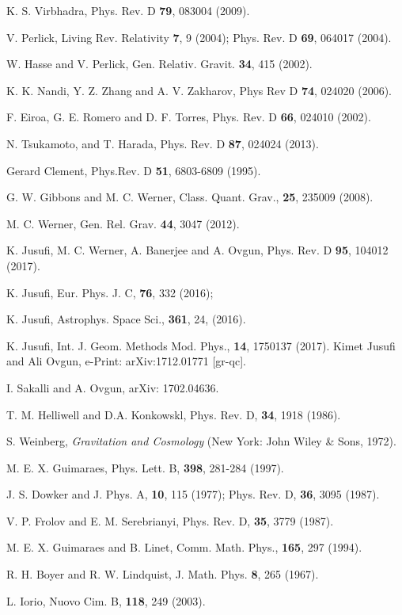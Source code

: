 \documentclass[preprint,superscriptaddress,amsfonts,amssymb,amsmath,showpacs]{revtex4}
\begin{document}
\begin{thebibliography}{99}
 K. S. Virbhadra, Phys. Rev. D \textbf{79}, 083004 (2009).

 V. Perlick, Living Rev. Relativity \textbf{7}, 9 (2004); Phys. Rev. D \textbf{69}, 064017 (2004).

 W. Hasse and V. Perlick, Gen. Relativ. Gravit. \textbf{34}, 415 (2002).

 K. K. Nandi, Y. Z. Zhang and A. V. Zakharov, Phys Rev D \textbf{74}, 024020 (2006).

 F. Eiroa, G. E. Romero and D. F. Torres, Phys. Rev. D \textbf{66}, 024010 (2002).

 N. Tsukamoto, and T. Harada, Phys. Rev. D \textbf{87}, 024024 (2013).

 Gerard Clement, Phys.Rev. D \textbf{51}, 6803-6809 (1995).


 G. W. Gibbons and M. C. Werner, Class. Quant. Grav., \textbf{25}, 235009 (2008).

  M. C. Werner, Gen. Rel. Grav. \textbf{44}, 3047 (2012).

 K. Jusufi, M. C. Werner, A. Banerjee and A. Ovgun,
Phys. Rev. D \textbf{95}, 104012 (2017).

 K. Jusufi, Eur. Phys. J. C, \textbf{76}, 332 (2016); 

 K. Jusufi, Astrophys. Space Sci., \textbf{361}, 24, (2016).

 K. Jusufi, Int. J. Geom. Methods Mod. Phys., \textbf{14}, 1750137 (2017).
 Kimet Jusufi and Ali Ovgun, e-Print: arXiv:1712.01771 [gr-qc].

 I. Sakalli and A. Ovgun, arXiv: 1702.04636.


 T. M. Helliwell and D.A. Konkowskl, Phys. Rev. D, \textbf{34}, 1918 (1986).

 S. Weinberg, \textit{Gravitation and Cosmology} (New York: John Wiley \& Sons, 1972).


  M. E. X. Guimaraes, Phys. Lett. B, {\bf 398}, 281-284 (1997).

 J. S. Dowker and J. Phys. A, {\bf 10}, 115 (1977); Phys. Rev. D, {\bf 36}, 3095 (1987).

 V. P. Frolov and E. M. Serebrianyi, Phys. Rev. D, {\bf 35}, 3779 (1987).

 M. E. X. Guimaraes and B. Linet, Comm. Math. Phys., {\bf 165}, 297 (1994).


 R. H. Boyer and R. W. Lindquist, J. Math. Phys. \textbf{8}, 265 (1967).

 L. Iorio, Nuovo Cim. B, \textbf{118}, 249 (2003). 








\end{thebibliography}
\end{document}
